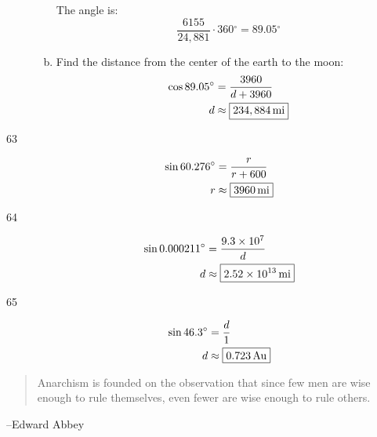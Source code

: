 \documentclass{exam}
\newcommand{\dg}{\ensuremath{^\circ}}
\begin{document}
\begin{description}
\begin{enumerate}[(a)]
            The angle is:
            \[
              \frac{6155}{24,881} \cdot 360 \dg = \boxed{ 89.05 \dg }
            \]

          \item Find the distance from the center of the earth to the moon:
            \begin{align*}
              \cos 89.05 \dg & = \frac{3960}{d + 3960} \\
              d              & \approx \boxed{ \unit[ 234,884 ]{mi} } \\
            \end{align*}

        \end{enumerate}

        \item[63]
          \begin{align*}
            \sin 60.276 \dg & = \frac{r}{r + 600} \\
            r               & \approx \boxed{ \unit[3960]{mi} } \\
          \end{align*}

        \item[64]
          \begin{align*}
            \sin 0.000211 \dg & = \frac{9.3 \times 10^7}{d} \\
            d               & \approx \boxed{ \unit[2.52 \times 10^{13}]{mi} } \\
          \end{align*}

        \item[65]
          \begin{align*}
            \sin 46.3 \dg & = \frac{d}{1} \\
            d             & \approx \boxed{ \unit[0.723]{Au} } \\
          \end{align*}

    \end{description}

  \else
    \vspace{7 cm}
    \begin{quote}
      \begin{em}
        Anarchism is founded on the observation that since few men are wise enough to rule themselves, even fewer are
        wise enough to rule others.  
      \end{em}
    \end{quote}
    \hspace{1 cm} --Edward Abbey
  \fi
\end{document}
